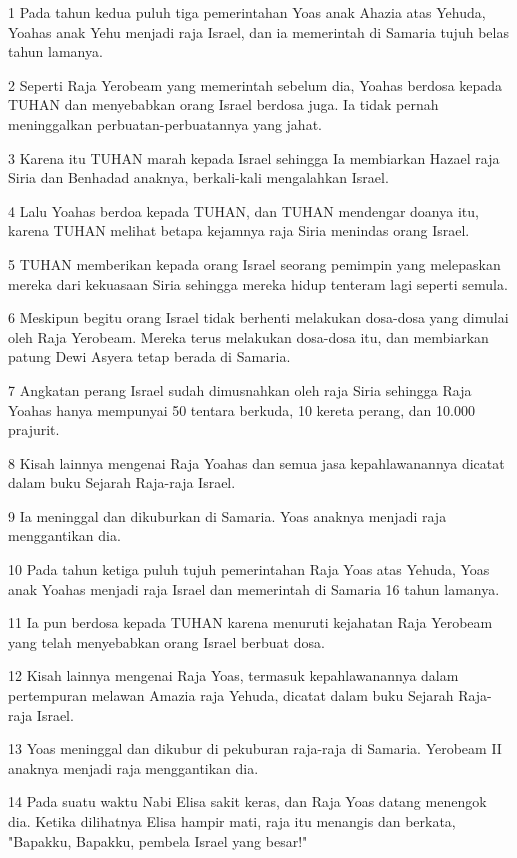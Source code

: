 \par 1 Pada tahun kedua puluh tiga pemerintahan Yoas anak Ahazia atas Yehuda, Yoahas anak Yehu menjadi raja Israel, dan ia memerintah di Samaria tujuh belas tahun lamanya.
\par 2 Seperti Raja Yerobeam yang memerintah sebelum dia, Yoahas berdosa kepada TUHAN dan menyebabkan orang Israel berdosa juga. Ia tidak pernah meninggalkan perbuatan-perbuatannya yang jahat.
\par 3 Karena itu TUHAN marah kepada Israel sehingga Ia membiarkan Hazael raja Siria dan Benhadad anaknya, berkali-kali mengalahkan Israel.
\par 4 Lalu Yoahas berdoa kepada TUHAN, dan TUHAN mendengar doanya itu, karena TUHAN melihat betapa kejamnya raja Siria menindas orang Israel.
\par 5 TUHAN memberikan kepada orang Israel seorang pemimpin yang melepaskan mereka dari kekuasaan Siria sehingga mereka hidup tenteram lagi seperti semula.
\par 6 Meskipun begitu orang Israel tidak berhenti melakukan dosa-dosa yang dimulai oleh Raja Yerobeam. Mereka terus melakukan dosa-dosa itu, dan membiarkan patung Dewi Asyera tetap berada di Samaria.
\par 7 Angkatan perang Israel sudah dimusnahkan oleh raja Siria sehingga Raja Yoahas hanya mempunyai 50 tentara berkuda, 10 kereta perang, dan 10.000 prajurit.
\par 8 Kisah lainnya mengenai Raja Yoahas dan semua jasa kepahlawanannya dicatat dalam buku Sejarah Raja-raja Israel.
\par 9 Ia meninggal dan dikuburkan di Samaria. Yoas anaknya menjadi raja menggantikan dia.
\par 10 Pada tahun ketiga puluh tujuh pemerintahan Raja Yoas atas Yehuda, Yoas anak Yoahas menjadi raja Israel dan memerintah di Samaria 16 tahun lamanya.
\par 11 Ia pun berdosa kepada TUHAN karena menuruti kejahatan Raja Yerobeam yang telah menyebabkan orang Israel berbuat dosa.
\par 12 Kisah lainnya mengenai Raja Yoas, termasuk kepahlawanannya dalam pertempuran melawan Amazia raja Yehuda, dicatat dalam buku Sejarah Raja-raja Israel.
\par 13 Yoas meninggal dan dikubur di pekuburan raja-raja di Samaria. Yerobeam II anaknya menjadi raja menggantikan dia.
\par 14 Pada suatu waktu Nabi Elisa sakit keras, dan Raja Yoas datang menengok dia. Ketika dilihatnya Elisa hampir mati, raja itu menangis dan berkata, "Bapakku, Bapakku, pembela Israel yang besar!"
